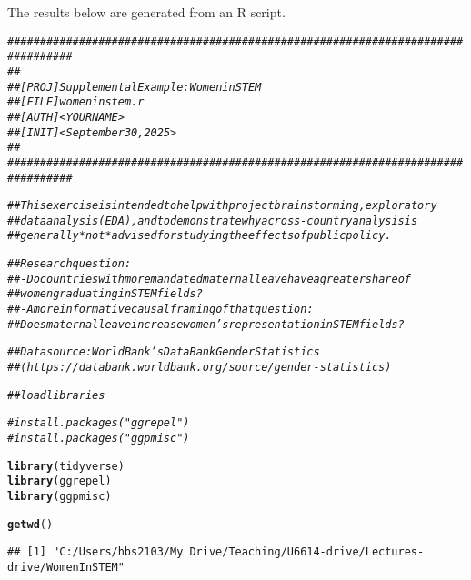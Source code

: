 \documentclass{article}\usepackage[]{graphicx}\usepackage[]{xcolor}
\makeatletter
\newcommand{\hlcom}[1]{\textcolor[rgb]{0.678,0.584,0.686}{\textit{#1}}}%
\newcommand{\hldef}[1]{\textcolor[rgb]{0.345,0.345,0.345}{#1}}%
\newcommand{\hlkwd}[1]{\textcolor[rgb]{0.737,0.353,0.396}{\textbf{#1}}}%
\newenvironment{kframe}{%
 \def\at@end@of@kframe{}%
 \ifinner\ifhmode%
  \def\at@end@of@kframe{\end{minipage}}%
  \begin{minipage}{\columnwidth}%
 \fi\fi%
 \def\FrameCommand##1{\hskip\@totalleftmargin \hskip-\fboxsep
 \colorbox{shadecolor}{##1}\hskip-\fboxsep
     \hskip-\linewidth \hskip-\@totalleftmargin \hskip\columnwidth}%
 \MakeFramed {\advance\hsize-\width
   \@totalleftmargin\z@ \linewidth\hsize
   \@setminipage}}%
 {\par\unskip\endMakeFramed%
 \at@end@of@kframe}
\newenvironment{knitrout}{}{} %
\makeatother
\begin{document}
\title{}



\maketitle
The results below are generated from an R script.

\begin{knitrout}
\color{fgcolor}\begin{kframe}
\begin{alltt}
\hlcom{################################################################################}
\hlcom{##}
\hlcom{## [ PROJ ] Supplemental Example: Women in STEM}
\hlcom{## [ FILE ] womeninstem.r}
\hlcom{## [ AUTH ] < YOUR NAME >}
\hlcom{## [ INIT ] < September 30, 2025 >}
\hlcom{##}
\hlcom{################################################################################}

\hlcom{## This exercise is intended to help with project brainstorming, exploratory}
\hlcom{## data analysis (EDA), and to demonstrate why a cross-country analysis is}
\hlcom{## generally *not* advised for studying the effects of public policy.}

\hlcom{## Research question:}
\hlcom{##  - Do countries with more mandated maternal leave have a greater share of }
\hlcom{##    women graduating in STEM fields?}
\hlcom{##  - A more informative causal framing of that question:}
\hlcom{##     Does maternal leave increase women's representation in STEM fields?}

\hlcom{## Data source: World Bank's DataBank Gender Statistics}
\hlcom{##  (https://databank.worldbank.org/source/gender-statistics)}
\end{alltt}
\end{kframe}
\end{knitrout}
\begin{knitrout}
\color{fgcolor}\begin{kframe}
\begin{alltt}
\hlcom{## load libraries}
\end{alltt}
\end{kframe}
\end{knitrout}
\begin{knitrout}
\color{fgcolor}\begin{kframe}
\begin{alltt}
\hlcom{# install.packages("ggrepel")}
\hlcom{# install.packages("ggpmisc")}

\hlkwd{library}\hldef{(tidyverse)}
\hlkwd{library}\hldef{(ggrepel)}
\hlkwd{library}\hldef{(ggpmisc)}

\hlkwd{getwd}\hldef{()}
\end{alltt}
\begin{verbatim}
## [1] "C:/Users/hbs2103/My Drive/Teaching/U6614-drive/Lectures-drive/WomenInSTEM"
\end{verbatim}
\end{kframe}
\end{knitrout}
\end{document}
